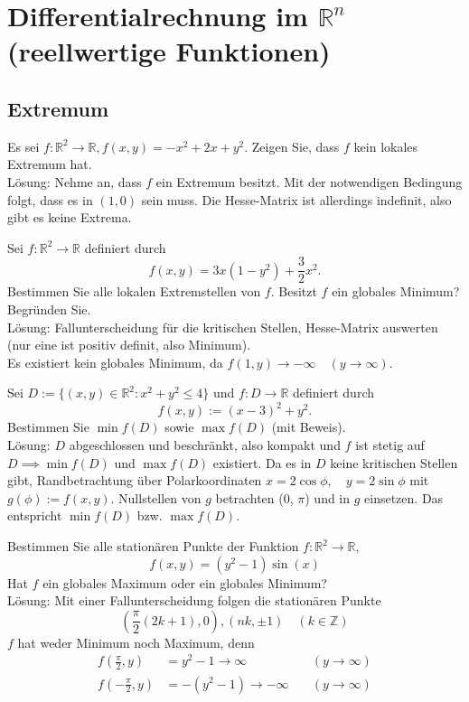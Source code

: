 \section{Differentialrechnung im $\mathbb{R}^n$ (reellwertige Funktionen)}
\subsection{Extremum}
Es sei $f : \mathbb{R}^2 \to \mathbb{R}, f(x,y) = -x^2 + 2x + y^2$.
Zeigen Sie, dass $f$ kein lokales Extremum hat.\\
Lösung:
Nehme an, dass $f$ ein Extremum besitzt.
Mit der notwendigen Bedingung folgt, dass es in $(1,0)$ sein muss.
Die Hesse-Matrix ist allerdings indefinit, also gibt es keine Extrema.

Sei $f : \mathbb{R}^2 \to \mathbb{R}$ definiert durch
\begin{displaymath}
  f(x,y) = 3x(1 - y^2) + \frac{3}{2}x^2.
\end{displaymath}
Bestimmen Sie alle lokalen Extremstellen von $f$.
Besitzt $f$ ein globales Minimum?
Begründen Sie.\\
Lösung:
Fallunterscheidung für die kritischen Stellen, Hesse-Matrix auswerten (nur eine ist positiv definit, also Minimum).\\
Es existiert kein globales Minimum, da $f(1,y) \to -\infty \quad (y \to \infty)$.

Sei $D := \{(x,y) \in \mathbb{R}^2 : x^2 + y^2 \leq 4\}$ und $f : D \to \mathbb{R}$ definiert durch
\begin{displaymath}
  f(x,y) := (x - 3)^2 + y^2.
\end{displaymath}
Bestimmen Sie $\min f(D)$ sowie $\max f(D)$ (mit Beweis).\\
Lösung:
$D$ abgeschlossen und beschränkt, also kompakt und $f$ ist stetig auf $D \implies \min f(D)$ und $\max f(D)$ existiert.
Da es in $D$ keine kritischen Stellen gibt, Randbetrachtung über Polarkoordinaten $x = 2 \cos \phi, \quad y = 2 \sin \phi$ mit $g(\phi) := f(x,y)$.
Nullstellen von $g$ betrachten ($0$, $\pi$) und in $g$ einsetzen.
Das entspricht $\min f(D)$ bzw. $\max f(D)$.

Bestimmen Sie alle stationären Punkte der Funktion $f : \mathbb{R}^2 \to \mathbb{R}$,
\begin{displaymath}
  f(x,y) = (y^2 - 1) \sin(x)
\end{displaymath}
Hat $f$ ein globales Maximum oder ein globales Minimum?\\
Lösung:
Mit einer Fallunterscheidung folgen die stationären Punkte
\begin{displaymath}
  \left(\frac{\pi}{2}\left(2k + 1\right), 0\right), (nk, \pm 1) \quad (k \in \mathbb{Z})
\end{displaymath}
$f$ hat weder Minimum noch Maximum, denn
\begin{align*}
  f\left(\frac{\pi}{2}, y\right) &= y^2 - 1 \to \infty &\quad (y \to \infty)\\
  f\left(-\frac{\pi}{2}, y\right) &= -(y^2 - 1) \to -\infty &\quad (y \to \infty)
\end{align*}

